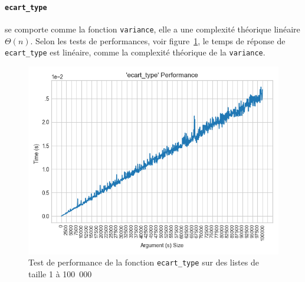 \documentclass[12pt]{article}
\begin{document}
\paragraph{\texttt{ecart\_type}} se comporte comme la fonction \texttt{variance}, elle a une complexité théorique linéaire $\Theta(n)$. Selon les tests de performances, voir figure~\ref{perfecartt}, le temps de réponse de \texttt{ecart\_type} est linéaire, comme la complexité théorique de la \texttt{variance}.
     \begin{figure}[!h]
        \centering
        \includegraphics[scale=0.8]{Images/Performance/Stats/performance_ecart_type_100000.png}
        \caption{Test de performance de la fonction \texttt{ecart\_type} sur des listes de taille 1 à 100~000}
        \label{perfecartt}
    \end{figure}
\end{document}
